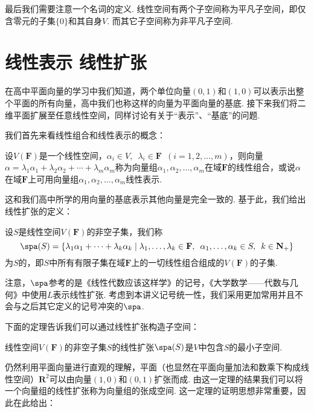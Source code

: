 最后我们需要注意一个名词的定义. 线性空间有两个子空间称为平凡子空间，即仅含零元的子集$\{0\}$和其自身$V$. 而其它子空间称为非平凡子空间.

\section{线性表示 \quad 线性扩张}

在高中平面向量的学习中我们知道，两个单位向量$(0,1)$和$(1,0)$可以表示出整个平面的所有向量，高中我们也称这样的向量为平面向量的基底. 接下来我们将二维平面扩展至任意线性空间，同样讨论有关于``表示''、``基底''的问题.

我们首先来看线性组合和线性表示的概念：
\begin{definition}
    设$V(\mathbf{F})$是一个线性空间，$\alpha_i\in V,\enspace\lambda_i\in \mathbf{F}\enspace(i=1,2,\ldots,m)$，则向量$\alpha=\lambda_1\alpha_1+\lambda_2\alpha_2+\cdots+\lambda_m\alpha_m$称为向量组$\alpha_1,\alpha_2,\ldots,\alpha_m$在域$\mathbf{F}$的线性组合，或说$\alpha$在域$\mathbf{F}$上可用向量组$\alpha_1,\alpha_2,\ldots,\alpha_m$线性表示.
\end{definition}
这和我们高中所学的用向量的基底表示其他向量是完全一致的. 基于此，我们给出线性扩张的定义：
\begin{definition}
    设$S$是线性空间$V(\mathbf{F})$的非空子集，我们称
    \[ \spa(S)=\{\lambda_1\alpha_1+\cdots+\lambda_k\alpha_k \mid \lambda_1,\ldots,\lambda_k\in\mathbf{F},\enspace\alpha_1,\ldots,\alpha_k\in S,\enspace k\in\mathbf{N}_+\} \]
    为$S$的，即$S$中所有有限子集在域$\mathbf{F}$上的一切线性组合组成的$V(\mathbf{F})$的子集.
\end{definition}
注意，$\spa$参考的是《线性代数应该这样学》的记号，《大学数学——代数与几何》中使用$L$表示线性扩张. 考虑到本讲义记号统一性，我们采用更加常用并且不会与之后其它定义的记号冲突的$\spa$.

下面的定理告诉我们可以通过线性扩张构造子空间：
\begin{theorem}\label{thm:2:线性扩张构造子空间}
    线性空间$V(\mathbf{F})$的非空子集$S$的线性扩张$\spa(S)$是$V$中包含$S$的最小子空间.
\end{theorem}
仍然利用平面向量进行直观的理解，平面（也显然在平面向量加法和数乘下构成线性空间）$\mathbf{R}^2$可以由向量$(1,0)$和$(0,1)$扩张而成. 由这一定理的结果我们可以将一个向量组的线性扩张称为向量组的张成空间. 这一定理的证明思想非常重要，因此在此给出：

